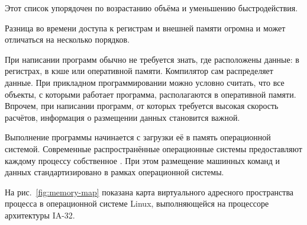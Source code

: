 Этот список упорядочен по возрастанию объёма и уменьшению
быстродействия.

Разница во времени доступа к регистрам и внешней памяти огромна и
может отличаться на несколько порядков.

При написании программ обычно не требуется знать, где расположены
данные: в регистрах, в кэше или оперативной памяти. Компилятор сам
распределяет данные. При прикладном программировании можно условно
считать, что все объекты, с которыми работает программа, располагаются
в оперативной памяти. Впрочем, при написании программ, от которых
требуется высокая скорость расчётов, информация о размещении данных
становится важной.


Выполнение программы начинается с загрузки её в память операционной
системой. Современные распространённые операционные системы
предоставляют каждому процессу собственное
. При этом
размещение машинных команд и данных стандартизировано в рамках
операционной системы.

На рис.~\ref{fig:memory-map} показана карта виртуального адресного
пространства процесса в операционной системе Linux, выполняющейся на
процессоре архитектуры IA-32.

